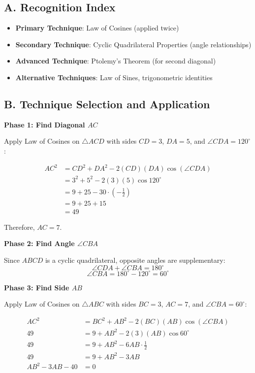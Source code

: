 \documentclass[11pt]{article}
\begin{document}
\begin{techniquesbox}
\subsection*{A. Recognition Index}
\begin{itemize}[leftmargin=*]
    \item \textbf{Primary Technique}: Law of Cosines (applied twice)
    \item \textbf{Secondary Technique}: Cyclic Quadrilateral Properties (angle relationships)
    \item \textbf{Advanced Technique}: Ptolemy's Theorem (for second diagonal)
    \item \textbf{Alternative Techniques}: Law of Sines, trigonometric identities
\end{itemize}

\subsection*{B. Technique Selection and Application}

\textbf{Phase 1: Find Diagonal $AC$}

Apply Law of Cosines on $\triangle ACD$ with sides $CD = 3$, $DA = 5$, and $\angle CDA = 120^\circ$:

\begin{align*}
AC^2 &= CD^2 + DA^2 - 2(CD)(DA)\cos(\angle CDA) \\
&= 3^2 + 5^2 - 2(3)(5)\cos 120^\circ \\
&= 9 + 25 - 30 \cdot \left(-\frac{1}{2}\right) \\
&= 9 + 25 + 15 \\
&= 49
\end{align*}

Therefore, $AC = 7$.

\textbf{Phase 2: Find Angle $\angle CBA$}

Since $ABCD$ is a cyclic quadrilateral, opposite angles are supplementary:
\[\angle CDA + \angle CBA = 180^\circ\]
\[\angle CBA = 180^\circ - 120^\circ = 60^\circ\]

\textbf{Phase 3: Find Side $AB$}

Apply Law of Cosines on $\triangle ABC$ with sides $BC = 3$, $AC = 7$, and $\angle CBA = 60^\circ$:

\begin{align*}
AC^2 &= BC^2 + AB^2 - 2(BC)(AB)\cos(\angle CBA) \\
49 &= 9 + AB^2 - 2(3)(AB)\cos 60^\circ \\
49 &= 9 + AB^2 - 6AB \cdot \frac{1}{2} \\
49 &= 9 + AB^2 - 3AB \\
AB^2 - 3AB - 40 &= 0
\end{align*}


\end{techniquesbox}
\end{document}
